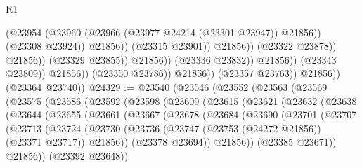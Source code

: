 \begin{lexlean}{R1}
\begin{coremodule}
                                                    (@23954
                                                      (@23960
                                                        (@23966
                                                          (@23977 @24214 (@23301 @23947))
                                                          @21856))
                                                      (@23308 @23924))
                                                    @21856))
                                                (@23315 @23901))
                                              @21856))
                                          (@23322 @23878))
                                        @21856))
                                    (@23329 @23855))
                                  @21856))
                              (@23336 @23832))
                            @21856))
                        (@23343 @23809))
                      @21856))
                  (@23350 @23786))
                @21856))
            (@23357 @23763))
          @21856))
      (@23364 @23740))
@24329 := @23540
    (@23546
      (@23552
        (@23563
          (@23569
            (@23575
              (@23586
                (@23592
                  (@23598
                    (@23609
                      (@23615
                        (@23621
                          (@23632
                            (@23638
                              (@23644
                                (@23655
                                  (@23661
                                    (@23667
                                      (@23678
                                        (@23684
                                          (@23690
                                            (@23701
                                              (@23707
                                                (@23713
                                                  (@23724
                                                    (@23730
                                                      (@23736
                                                        (@23747
                                                          (@23753 (@24272 @21856))
                                                          (@23371 @23717))
                                                        @21856))
                                                    (@23378 @23694))
                                                  @21856))
                                              (@23385 @23671))
                                            @21856))
                                        (@23392 @23648))

\end{coremodule}
\end{lexlean}
